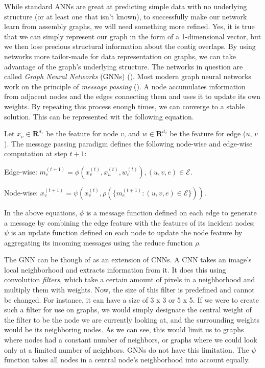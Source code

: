 \documentclass[times, utf8, diplomski, english]{fer_eng}
\begin{document}
While standard ANNs are great at predicting simple data with no underlying structure (or at least one that isn't known), to successfully make our network learn from assembly graphs, we will need something more refined. Yes, it is true that we can simply represent our graph in the form of a 1-dimensional vector, but we then lose precious structural information about the contig overlaps. By using networks more tailor-made for data representation on graphs, we can take advantage of the graph's underlying structure. The networks in question are called \textit{Graph Neural Networks} (GNNs) (\cite{GNN}). Most modern graph neural networks work on the principle of \textit{message passing} (\cite{message_passing}). A node accumulates information from adjacent nodes and the edges connecting them and uses it to update its own weights. By repeating this process enough times, we can converge to a stable solution. This can be represented wit the following equation.


Let $x_v \in \mathbf{R}^{d_1}$ be the feature for node $v$, and $w \in \mathbf{R}^{d_2}$ be the feature for edge ($u$, $v$). The message passing paradigm defines the following node-wise and edge-wise computation at step $t+1$:

Edge-wise: $m_e^{(t+1)} = \phi (x_v^{(t)}, x_u^{(t)}, w_e^{(t)}), (u, v, e) \in \mathcal{E}$.

Node-wise: $x_v^{(t+1)} = \psi (x_v^{(t)}, \rho (\{m_e^{(t+1)}: (u, v, e) \in \mathcal{E}\}))$.

In the above equations, $\phi$ is a message function defined on each edge to generate a message by combining the edge feature with the features of its incident nodes; $\psi$ is an update function defined on each node to update the node feature by aggregating its incoming messages using the reduce function $\rho$.

The GNN can be though of as an extension of CNNs. A CNN takes an image's local neighborhood and extracts information from it. It does this using convolution \textit{filters}, which take a certain amount of pixels in a neighborhood and multiply them with weights. Now, the size of this filter is predefined and cannot be changed. For instance, it can have a size of 3 x 3 or 5 x 5. If we were to create such a filter for use on graphs, we would simply designate the central weight of the filter to be the node we are currently looking at, and the surrounding weights would be its neighboring nodes. As we can see, this would limit us to graphs where nodes had a constant number of neighbors, or graphs where we could look only at a limited number of neighbors. GNNs do not have this limitation. The $\psi$ function takes all nodes in a central node's neighborhood into account equally.
\end{document}

